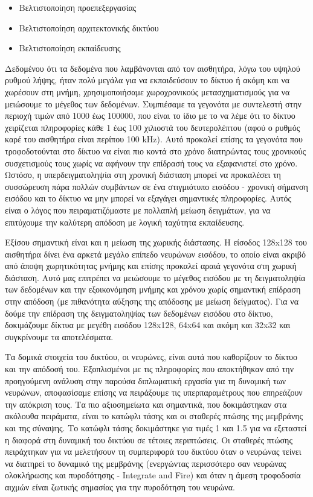 \documentclass[12pt]{report}
\begin{document}
\begin{itemize}
    \item Βελτιστοποίηση προεπεξεργασίας
    \item Βελτιστοποίηση αρχιτεκτονικής δικτύου
    \item Βελτιστοποίηση εκπαίδευσης
\end{itemize}

Δεδομένου ότι τα δεδομένα που λαμβάνονται από τον αισθητήρα, λόγω του υψηλού ρυθμού λήψης, ήταν πολύ μεγάλα για να εκπαιδεύσουν το δίκτυο ή ακόμη και να χωρέσουν στη μνήμη, χρησιμοποιήσαμε χωροχρονικούς μετασχηματισμούς για να μειώσουμε το μέγεθος των δεδομένων. Συμπιέσαμε τα γεγονότα με συντελεστή στην περιοχή τιμών από 1000 έως 100000, που είναι το ίδιο με το να λέμε ότι το δίκτυο χειρίζεται πληροφορίες κάθε 1 έως 100 χιλιοστά του δευτερολέπτου (αφού ο ρυθμός καρέ του αισθητήρα είναι περίπου 100 \textlatin{kHz}). Αυτό προκαλεί επίσης τα γεγονότα που τροφοδοτούνται στο δίκτυο να είναι πιο κοντά στο χρόνο διατηρώντας τους χρονικούς συσχετισμούς τους χωρίς να αφήνουν την επίδρασή τους να εξαφανιστεί στο χρόνο. Ωστόσο, η υπερδειγματοληψία στη χρονική διάσταση μπορεί να προκαλέσει τη συσσώρευση πάρα πολλών συμβάντων σε ένα στιγμιότυπο εισόδου - χρονική σήμανση εισόδου και το δίκτυο να μην μπορεί να εξαγάγει σημαντικές πληροφορίες. Αυτός είναι ο λόγος που πειραματιζόμαστε με πολλαπλή μείωση δειγμάτων, για να επιτύχουμε την καλύτερη απόδοση με λογική ταχύτητα εκπαίδευσης.

Εξίσου σημαντική είναι και η μείωση της χωρικής διάστασης. Η είσοδος 128\textlatin{x}128 του αισθητήρα δίνει ένα αρκετά μεγάλο επίπεδο νευρώνων εισόδου, το οποίο είναι ακριβό από άποψη χωρητικότητας μνήμης και επίσης προκαλεί αραιά γεγονότα στη χωρική διάσταση. Αυτό μας επιτρέπει να μειώσουμε το μέγεθος εισόδου με τη δειγματοληψία των δεδομένων και την εξοικονόμηση μνήμης και χρόνου χωρίς σημαντική επίδραση στην απόδοση (με πιθανότητα αύξησης της απόδοσης με μείωση δείγματος). Για να δούμε την επίδραση της δειγματοληψίας των δεδομένων εισόδου στο δίκτυο, δοκιμάζουμε δίκτυα με μεγέθη εισόδου 128\textlatin{x}128, 64\textlatin{x}64 και ακόμη και 32\textlatin{x}32 και συγκρίνουμε τα αποτελέσματα.

Τα δομικά στοιχεία του δικτύου, οι νευρώνες, είναι αυτά που καθορίζουν το δίκτυο και την απόδοσή του. Εξοπλισμένοι με τις πληροφορίες που αποκτήθηκαν από την προηγούμενη ανάλυση στην παρούσα διπλωματική εργασία για τη δυναμική των νευρώνων, αποφασίσαμε επίσης να πειράξουμε τις υπερπαραμέτρους που επηρεάζουν την απόκριση τους. Τα πιο αξιοσημείωτα και σημαντικά, που δοκιμάστηκαν στα ακόλουθα πειράματα, είναι το κατώφλι τάσης και οι σταθερές πτώσης της μεμβράνης και της σύναψης. Το κατώφλι τάσης δοκιμάστηκε για τιμές 1 και 1.5 για να εξεταστεί η διαφορά στη δυναμική του δικτύου σε τέτοιες περιπτώσεις. Οι σταθερές πτώσης πειράχτηκαν για να μελετήσουν τη συμπεριφορά του δικτύου όταν ο νευρώνας τείνει να διατηρεί το δυναμικό της μεμβράνης (ενεργώντας περισσότερο σαν νευρώνας ολοκλήρωσης και πυροδότησης - \textlatin{Integrate and Fire}) και όταν η άμεση τροφοδοσία αιχμών είναι ζωτικής σημασίας για την πυροδότηση του νευρώνα.
\end{document}
